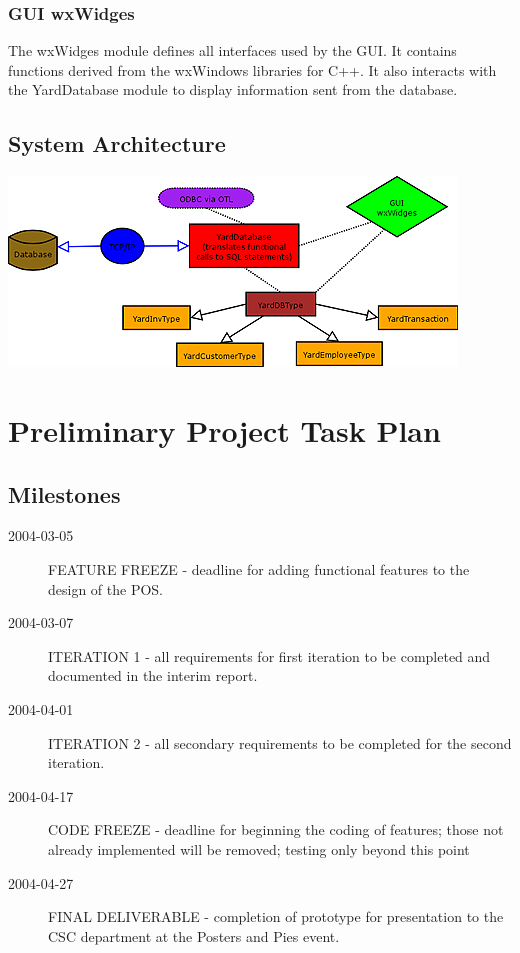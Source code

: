 \documentclass{report}
\begin{document}
        \subsubsection{GUI wxWidges}
        The wxWidges module defines all interfaces used by the
        GUI.  It contains functions derived from the wxWindows
        libraries for C++.  It also interacts with the
        YardDatabase module to display information sent from the
        database.


    \subsection{System Architecture}
    \includegraphics{yardsale_modules.png}

\section{Preliminary Project Task Plan}

    \subsection{Milestones}
    \begin{description}
        \item[2004-03-05] FEATURE FREEZE - deadline for adding functional
        features to the design of the POS.
        \item[2004-03-07] ITERATION 1 - all requirements for first
        iteration to be completed and documented in the interim
        report.
        \item[2004-04-01] ITERATION 2 - all secondary requirements
        to be completed for the second iteration.
        \item[2004-04-17] CODE FREEZE - deadline for beginning the
        coding of features; those not already implemented will be removed;
        testing only beyond this point
        \item[2004-04-27] FINAL DELIVERABLE - completion of
        prototype for presentation to the CSC department at the
        Posters and Pies event.
    \end{description}
\end{document}
